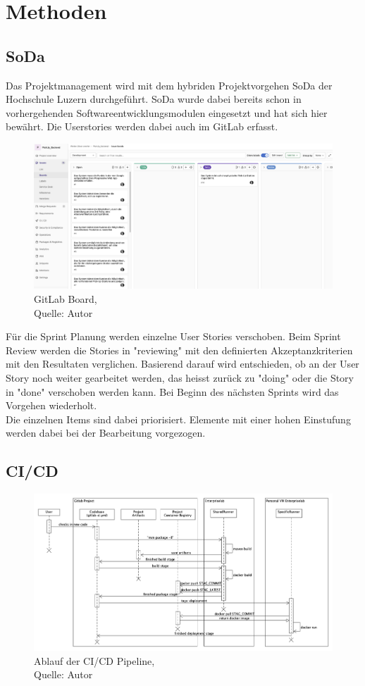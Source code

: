 \section{Methoden}
\subsection{\gls{SoDa}}
Das Projektmanagement wird mit dem hybriden Projektvorgehen \gls{SoDa} der Hochschule Luzern durchgeführt. 
SoDa wurde dabei bereits schon in vorhergehenden Softwareentwicklungsmodulen eingesetzt und hat sich hier bewährt. Die Userstories werden dabei auch im \gls{GitLab} erfasst.  
\begin{figure}[H]
	\centering
	\includegraphics[width=1\textwidth]{images/boardGitlab.png}
	\caption[GitLab Board]{GitLab Board,\\ Quelle: Autor}
	\label{img: GitlLabBoard}
\end{figure}
Für die Sprint Planung werden einzelne User Stories verschoben. Beim Sprint Review werden die Stories in "reviewing" mit den definierten Akzeptanzkriterien mit den Resultaten verglichen. Basierend darauf wird entschieden, ob an der \gls{User Story} noch weiter gearbeitet werden, das heisst zurück zu "doing" oder die Story in "done" verschoben werden kann. Bei Beginn des nächsten Sprints wird das Vorgehen wiederholt. \\
Die einzelnen Items sind dabei priorisiert. Elemente mit einer hohen Einstufung werden dabei bei der Bearbeitung vorgezogen. 

\subsection{CI/CD}
\begin{figure}[H]
	\centering
	\includegraphics[width=1\textwidth]{images/sequenceCicd.png}
	\caption[Ablauf der CI/CD Pipeline]{Ablauf der CI/CD Pipeline,\\ Quelle: Autor}
	\label{img: cicdPipeline}
\end{figure}


\newpage